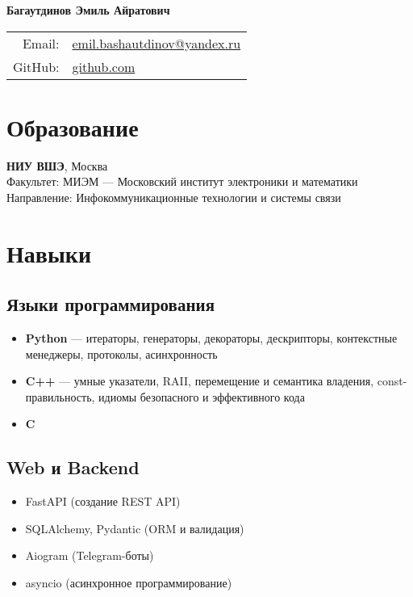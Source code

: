 \documentclass[a4paper,12pt]{article}
\begin{document}
	
	\begin{center}
		\Large\textbf{Багаутдинов Эмиль Айратович} \\
		\normalsize
		\vspace{5pt}
		\begin{tabular}{rl}
			Email: & \href{mailto:emil.bashautdinov@yandex.ru}{emil.bashautdinov@yandex.ru} \\
			GitHub: & \href{https://github.com/dmngwtf}{github.com} \\
		\end{tabular}
	\end{center}
	
	\vspace{10pt}
	
	\section*{Образование}
	\textbf{НИУ ВШЭ}, Москва \\
	Факультет: МИЭМ — Московский институт электроники и математики \\
	Направление: Инфокоммуникационные технологии и системы связи
	
	\vspace{10pt}
	
	\section*{Навыки}
	
	\subsection*{Языки программирования}
	\begin{itemize}[leftmargin=1.5em]
    \item \textbf{Python} —  итераторы, генераторы, декораторы, дескрипторы, контекстные менеджеры, протоколы, асинхронность 
    \item \textbf{C++} —    умные указатели, RAII, перемещение и семантика владения, const-правильность, идиомы безопасного и эффективного кода
    \item \textbf{C}
    
		
	\end{itemize}
	
	\subsection*{Web и Backend}
	\begin{itemize}[leftmargin=1.5em]
		\item FastAPI (создание REST API)
		\item SQLAlchemy, Pydantic (ORM и валидация)
		\item Aiogram (Telegram-боты)
		\item asyncio (асинхронное программирование)
	\end{itemize}
	
\end{document}

